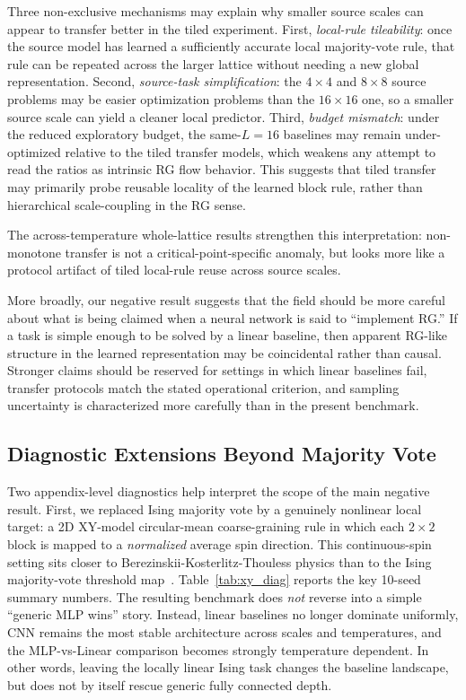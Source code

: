 \documentclass[12pt,a4paper]{memoir}
\begin{document}
Three non-exclusive mechanisms may explain why smaller source scales can appear
to transfer better in the tiled experiment.  First, \emph{local-rule tileability}:
once the source model has learned a sufficiently accurate local majority-vote
rule, that rule can be repeated across the larger lattice without needing a new
global representation.  Second, \emph{source-task simplification}: the
$4\times4$ and $8\times8$ source problems may be easier optimization problems
than the $16\times16$ one, so a smaller source scale can yield a cleaner local
predictor.  Third, \emph{budget mismatch}: under the reduced exploratory budget,
the same-$L=16$ baselines may remain under-optimized relative to the tiled
transfer models, which weakens any attempt to read the ratios as intrinsic RG
flow behavior.  This suggests that tiled transfer may primarily probe reusable
locality of the learned block rule, rather than hierarchical scale-coupling in
the RG sense.

The across-temperature whole-lattice results strengthen this interpretation:
non-monotone transfer is not a critical-point-specific anomaly, but looks more
like a protocol artifact of tiled local-rule reuse across source scales.

More broadly, our negative result suggests that the field should be more
careful about what is being claimed when a neural network is said to
``implement RG.''  If a task is simple enough to be solved by a linear
baseline, then apparent RG-like structure in the learned representation may
be coincidental rather than causal.  Stronger claims should be reserved for
settings in which linear baselines fail, transfer protocols match the
stated operational criterion, and sampling uncertainty is characterized more
carefully than in the present benchmark.

\subsection{Diagnostic Extensions Beyond Majority Vote}

Two appendix-level diagnostics help interpret the scope of the main negative
result.  First, we replaced Ising majority vote by a genuinely nonlinear local
target: a 2D XY-model circular-mean coarse-graining rule in which each $2\times
2$ block is mapped to a \emph{normalized} average spin direction.  This
continuous-spin setting sits closer to Berezinskii-Kosterlitz-Thouless physics
than to the Ising majority-vote threshold map~\citep{mermin1966,berezinskii1971,
kosterlitz1973,fernandez1986xy}.  Table~\ref{tab:xy_diag} reports the key
10-seed summary numbers.  The resulting benchmark does \emph{not}
reverse into a simple ``generic MLP wins'' story.  Instead, linear baselines no
longer dominate uniformly, CNN remains the most stable architecture across
scales and temperatures, and the MLP-vs-Linear comparison becomes strongly
temperature dependent.  In other words, leaving the locally linear Ising task
changes the baseline landscape, but does not by itself rescue generic fully
connected depth.
\end{document}

